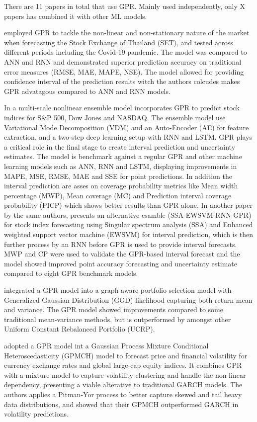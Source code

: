 There are 11 papers in  total that use GPR. Mainly used independently, only X papers has combined it with other ML models. 

\textcite{Suphawan2022gpr} employed GPR to tackle the non-linear and non-stationary nature of the market when forecasting the Stock Exchange of Thailand (SET), and tested across different periods including the Covid-19 pandemic. The model was compared to ANN and RNN and demonstrated superior prediction accuracy on traditional error measures (RMSE, MAE, MAPE, NSE). The model allowed for providing confidence interval of the prediction results witch the authors colcudes makes GPR advatagous compared to ANN and RNN models. 

In \textcite{Wang2021gpr} a multi-scale nonlinear ensemble model incorporates GPR to predict stock indices for S\&P 500, Dow Jones and NASDAQ. The ensemble model use Variational Mode Decomposition (VDM) and an Auto-Encoder (AE) for feature extraction, and a two-step deep learning setup with RNN and LSTM. GPR plays a critical role in the final stage to create interval prediction and uncertainty estimates. The model is benchmark against a regular GPR and other machine learning models such as ANN, RNN and LSTM, displaying improvements in MAPE, MSE, RMSE, MAE and SSE for point predictions. In addition the interval prediction are asses on coverage probability metrics like Mean width percentage (MWP), Mean coverage (MC) and Prediction interval coverage probability (PICP) which shows better results than GPR alone. In another paper by the same authors, \textcite{Wang2021gprensemble} presents an alternative esamble (SSA-EWSVM-RNN-GPR) for stock index forecasting using Singular spectrum analysis (SSA) and Enhanced weighted support vector machine (EWSVM) for interval prediction, which is then further process by an RNN before GPR is used to provide interval forecasts. MWP and CP were used to validate the GPR-based interval forecast and the model showed improved point accuracy forecasting and uncertainty estimate compared to eight GPR benchmark models.  

\textcite{Li2024gpr} integrated a GPR model into a graph-aware portfolio selection model with Generalized Gaussian Distribution (GGD) likelihood capturing both return mean and variance. The GPR model showed improvements compared to some traditional mean-variance methods, but is outperformed by amongst other Uniform Constant Rebalanced Portfolio (UCRP). 

\textcite{Platanios2014gpr} adopted a GPR model int a Gaussian Process Mixture Conditional Heteroscedasticity (GPMCH) model to forecast price and financial volatility for currency exchange rates and global large-cap equity indices.  It combines GPR with a mixture model to capture volatility clustering and handle the non-linear dependency, presenting a viable alterative to traditional GARCH models. The authors applies a Pitman-Yor process to better capture skewed and tail heavy data distributions, and showed that their GPMCH outperformed GARCH in volatility predictions. 

